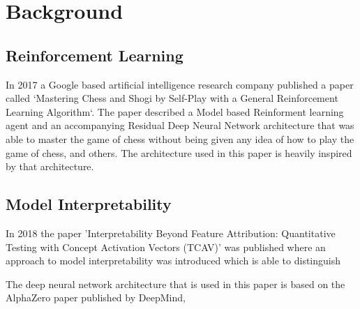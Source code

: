 \section{Background}

\subsection{Reinforcement Learning}

In 2017 a Google based artificial intelligence research company published a paper called
`Mastering Chess and Shogi by Self-Play with a General Reinforcement Learning Algorithm`.
The paper described a Model based Reinforment learning agent and an accompanying Residual
Deep Neural Network architecture that was able to master the game of chess without being
given any idea of how to play the game of chess, and others. The architecture used in this
paper is heavily inspired by that architecture.

\subsection{Model Interpretability}

In 2018 the paper 'Interpretability Beyond Feature Attribution: Quantitative Testing with Concept Activation Vectors (TCAV)'
was published where an approach to model interpretability was introduced which is able to
distinguish 

The deep neural network architecture that is used in this paper is based on the AlphaZero paper
published by DeepMind, 

